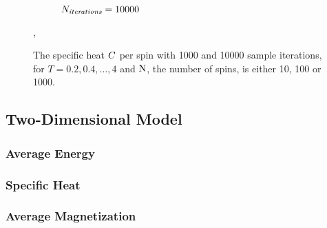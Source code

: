 \begin{figure}
\begin{subfigure}{\columnwidth}
			\caption{$N_\textit{iterations} = 10000$}
			\label{fig:results:1D:C:10000}
		\end{subfigure}	
		\caption{The specific heat $C$ per spin with  1000 and  10000 sample iterations, for $T = 0.2, 0.4, \dotsc, 4$ and $\mathrm{N}$, the number of spins, is either 10, 100 or 1000.}
		\label{fig:results:1D:C},
	\end{figure}

\subsection{Two-Dimensional Model}

	\subsubsection*{Average Energy}


	\subsubsection*{Specific Heat}

	\subsubsection*{Average Magnetization}
